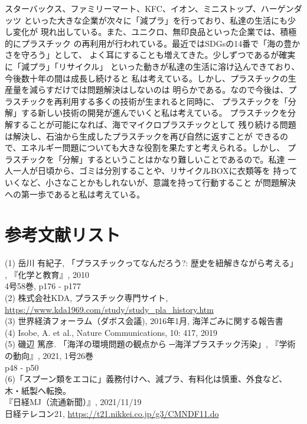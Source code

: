 \documentclass[dvipdfmx,autodetect-engine,titlepage]{jsarticle}
\begin{document}
スターバックス、ファミリーマート、KFC、イオン、ミニストップ、ハーゲンダッツ
といった大きな企業が次々に「減プラ」を行っており、私達の生活にも少し変化が
現れ出している。また、ユニクロ、無印良品といった企業では、積極的にプラスチック
の再利用が行われている。最近ではSDGsの14番で「海の豊かさを守ろう」として、
よく耳にすることも増えてきた。少しずつであるが確実に「減プラ」「リサイクル」
といった動きが私達の生活に溶け込んできており、今後数十年の間は成長し続けると
私は考えている。しかし、プラスチックの生産量を減らすだけでは問題解決はしないのは
明らかである。なので今後は、プラスチックを再利用する多くの技術が生まれると同時に、
プラスチックを「分解」する新しい技術の開発が進んでいくと私は考えている。
プラスチックを分解することが可能になれば、海でマイクロプラスチックとして
残り続ける問題は解決し、石油から生成したプラスチックを再び自然に返すことが
できるので、エネルギー問題についても大きな役割を果たすと考えられる。しかし、
プラスチックを「分解」するということはかなり難しいことであるので。私達
一人一人が日頃から、ゴミは分別することや、リサイクルBOXに衣類等を
持っていくなど、小さなことかもしれないが、意識を持って行動すること
が問題解決への第一歩であると私は考えている。

\section{参考文献リスト}

(1) 岳川 有紀子, 「プラスチックってなんだろう?: 歴史を紐解きながら考える」
 , 『化学と教育』, 2010\\
 \qquad\quad 4号58巻, p176 - p177\\

(2) 株式会社KDA, プラスチック専門サイト, \url{https://www.kda1969.com/study/study_pla_history.htm}\\

(3) 世界経済フォーラム（ダボス会議), 2016年1月, 海洋ごみに関する報告書\\

(4) Isobe, A. et al., Nature Communications, 10: 417, 2019\\

(5) 磯辺 篤彦. 「海洋の環境問題の観点から ─海洋プラスチック汚染」, 『学術の動向』, 2021, 1号26巻\\
\qquad\quad p48 - p50\\

(6)「スプーン類をエコに」義務付けへ、減プラ、有料化は慎重、外食など、木・紙製へ転換。\\
\qquad\quad 『日経MJ（流通新聞）』, 2021/11/19\\
\qquad\quad 日経テレコン21, \url{https://t21.nikkei.co.jp/g3/CMNDF11.do}\\
\end{document}
